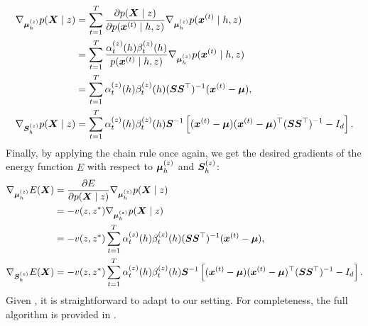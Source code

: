 \begin{align}
    \nabla_{{\bm{\mu}}^{(z)}_h} p({\bm{X}} \mid z) &= \sum_{t=1}^T \frac{\partial p({\bm{X}} \mid z)}{\partial p({\bm{x}}^{(t)} \mid h, z)} \nabla_{{\bm{\mu}}^{(z)}_h} p({\bm{x}}^{(t)} \mid h, z) \nonumber\\
    &= \sum_{t=1}^T \frac{\alpha_{t}^{(z)}(h) \beta_{t}^{(z)}(h)}{p({\bm{x}}^{(t)} \mid h, z)} \nabla_{{\bm{\mu}}^{(z)}_h} p({\bm{x}}^{(t)} \mid h, z) \nonumber\\
    &= \sum_{t=1}^T \alpha_{t}^{(z)}(h) \beta_{t}^{(z)}(h) ({\bm{S}} {\bm{S}} ^\top)^{-1} ({\bm{x}}^{(t)} - {\bm{\mu}}), \\
    \nabla_{{\bm{S}}^{(z)}_h} p({\bm{X}} \mid z) &= \sum_{t=1}^T \alpha_{t}^{(z)}(h) \beta_{t}^{(z)}(h) {\bm{S}}^{-1} \left[ ({\bm{x}}^{(t)} - {\bm{\mu}}) ({\bm{x}}^{(t)} - {\bm{\mu}})^\top ({\bm{S}} {\bm{S}} ^\top)^{-1} - I_d\right].
\end{align}
Finally, by applying the chain rule once again, we get the desired gradients of the energy function $E$ with respect to ${\bm{\mu}}^{(z)}_h$ and ${\bm{S}}^{(z)}_h$:
\begin{align}
    \nabla_{{\bm{\mu}}^{(z)}_h} E({\bm{X}}) &= \frac{\partial E}{\partial p({\bm{X}} \mid z)} \nabla_{{\bm{\mu}}^{(z)}_h} p({\bm{X}} \mid z) \nonumber\\
    &= -v(z, z^*) \nabla_{{\bm{\mu}}^{(z)}_h} p({\bm{X}} \mid z) \nonumber\\
    &= -v(z, z^*) \sum_{t=1}^T \alpha_{t}^{(z)}(h) \beta_{t}^{(z)}(h) ({\bm{S}} {\bm{S}} ^\top)^{-1} ({\bm{x}}^{(t)} - {\bm{\mu}}), \label{eq:sohmmm_grad_mu}\\
    \nabla_{{\bm{S}}^{(z)}_h} E({\bm{X}}) &= -v(z, z^*) \sum_{t=1}^T \alpha_{t}^{(z)}(h) \beta_{t}^{(z)}(h) {\bm{S}}^{-1} \left[ ({\bm{x}}^{(t)} - {\bm{\mu}}) ({\bm{x}}^{(t)} - {\bm{\mu}})^\top ({\bm{S}} {\bm{S}} ^\top)^{-1} - I_d\right]. \label{eq:sohmmm_grad_s}
\end{align}
Given , it is straightforward to adapt  to our setting. For completeness, the full algorithm is provided in .

